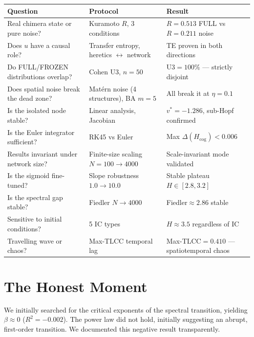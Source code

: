 \documentclass[11pt, a4paper]{article}
\newcommand{\result}[1]{\textbf{\color{positive}#1}}
\begin{document}
\renewcommand{\arraystretch}{1.2}
\begin{tabularx}{\linewidth}{>{\raggedright}p{5.5cm} >{\raggedright}p{4.5cm} >{\raggedright\arraybackslash}X}
\toprule
\textbf{Question} & \textbf{Protocol} & \textbf{Result} \\
\midrule
Real chimera state or pure noise? & Kuramoto $R$, 3 conditions & $R=0.513$ FULL vs $R=0.211$ noise \result{\checkmark} \\
Does $u$ have a causal role? & Transfer entropy, heretics $\leftrightarrow$ network & TE proven in both directions \result{\checkmark} \\
Do FULL/FROZEN distributions overlap? & Cohen U3, $n=50$ & U3$=100\%$ --- strictly disjoint \result{\checkmark} \\
Does spatial noise break the dead zone? & Matérn noise (4 structures), BA $m=5$ & All break it at $\eta=0.1$ \result{\checkmark} \\
Is the isolated node stable? & Linear analysis, Jacobian & $v^*=-1.286$, sub-Hopf confirmed \result{\checkmark} \\
Is the Euler integrator sufficient? & RK45 vs Euler & Max $\Delta(H_{\mathrm{cog}}) < 0.006$ \result{\checkmark} \\
Results invariant under network size? & Finite-size scaling $N=100\to4000$ & Scale-invariant mode validated \result{\checkmark} \\
Is the sigmoid fine-tuned? & Slope robustness $1.0\to10.0$ & Stable plateau $H\in[2.8, 3.2]$ \result{\checkmark} \\
Is the spectral gap stable? & Fiedler $N\to4000$ & Fiedler$\approx2.86$ stable \result{\checkmark} \\
Sensitive to initial conditions? & 5 IC types & $H\approx3.5$ regardless of IC \result{\checkmark} \\
Travelling wave or chaos? & Max-TLCC temporal lag & Max-TLCC$=0.410$ --- spatiotemporal chaos \result{\checkmark} \\
\bottomrule
\end{tabularx}

\section{The Honest Moment}

We initially searched for the critical exponents of the spectral transition, yielding $\beta \approx 0$ ($R^2 = -0.002$). 
The power law did not hold, initially suggesting an abrupt, first-order transition. We documented this negative result transparently.
\end{document}
